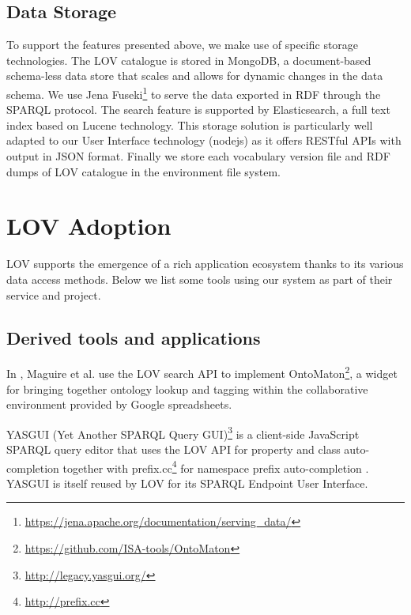\documentclass{iosart2c}
\begin{document}
\subsection{Data Storage}

To support the features presented above, we make use of specific storage technologies. The LOV catalogue is stored in MongoDB\textregistered, a document-based schema-less data store that scales and allows for dynamic changes in the data schema. We use Jena Fuseki\footnote{\url{https://jena.apache.org/documentation/serving_data/}} to serve the data exported in RDF through the SPARQL protocol. The search feature is supported by Elasticsearch\textregistered, a full text index based on Lucene technology. This storage solution is particularly well adapted to our User Interface technology (nodejs) as it offers RESTful APIs with output in JSON format. Finally we store each vocabulary version file and RDF dumps of LOV catalogue in the environment file system.



\section{LOV Adoption}
\label{sec:lovecosystem}
LOV supports the emergence of a rich application ecosystem thanks to its various data access methods. Below we list some tools using our system as part of their service and project.
 
\subsection{Derived tools and applications}

In \cite{ontomaton12}, Maguire et al. use the LOV search API to implement OntoMaton\footnote{\url{https://github.com/ISA-tools/OntoMaton}}, a widget for bringing together ontology lookup and tagging within the collaborative environment provided by Google spreadsheets. 

YASGUI (Yet Another SPARQL Query GUI)\footnote{\url{http://legacy.yasgui.org/}} is a client-side JavaScript SPARQL query editor that uses the LOV API for property and class auto-completion together with prefix.cc\footnote{\url{http://prefix.cc}} for namespace prefix auto-completion \cite{yasgui}. YASGUI is itself reused by LOV for its SPARQL Endpoint User Interface.
\end{document}
